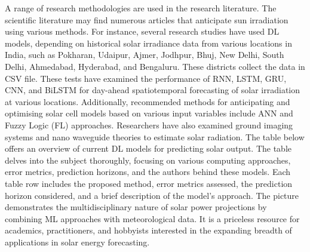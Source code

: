 \documentclass[a4paper,fleqn]{cas-sc}
\begin{document}
A range of research methodologies are used in the research literature. The scientific literature may find numerous articles that anticipate sun irradiation using various methods. For instance, several research studies have used DL models, depending on historical solar irradiance data from various locations in India, such as Pokharan, Udaipur, Ajmer, Jodhpur, Bhuj, New Delhi, South Delhi, Ahmedabad, Hyderabad, and Bengaluru. These districts collect the data in CSV file\cite{kumari2021deep}. These tests have examined the performance of RNN, LSTM, GRU, CNN, and BiLSTM for day-ahead spatiotemporal forecasting of solar irradiation at various locations. Additionally, recommended methods for anticipating and optimising solar cell models based on various input variables include ANN and Fuzzy Logic (FL) approaches. Researchers have also examined ground imaging systems and nano waveguide theories to estimate solar radiation\cite{kumari2021deep}. The table below offers an overview of current DL models for predicting solar output. The table delves into the subject thoroughly, focusing on various computing approaches, error metrics, prediction horizons, and the authors behind these models. Each table row includes the proposed method, error metrics assessed, the prediction horizon considered, and a brief description of the model's approach. The picture demonstrates the multidisciplinary nature of solar power projections by combining ML approaches with meteorological data. It is a priceless resource for academics, practitioners, and hobbyists interested in the expanding breadth of applications in solar energy forecasting.
\end{document}
